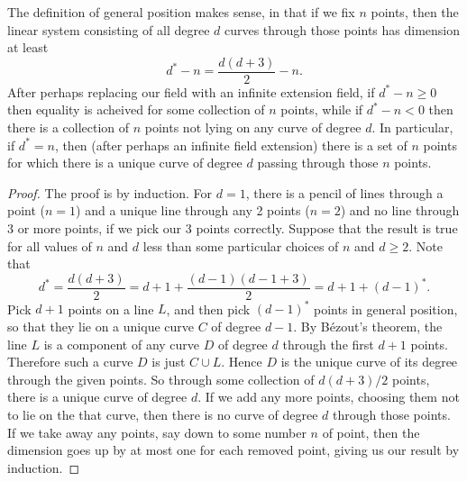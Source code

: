 \begin{lemma}\label{lemma:general.position.defined}
The definition of general position makes sense, in that if we fix \(n\) points, then the linear system consisting of all degree \(d\) curves through those points has dimension at least 
\[
d^*-n=\frac{d(d+3)}{2}-n.
\]
After perhaps replacing our field with an infinite extension field, if \(d^*-n \ge 0 \) then equality is acheived for some collection of \(n\) points, while if \(d^*-n<0\) then there is a collection of \(n\) points not lying on any curve of degree \(d\).
In particular, if \(d^*=n\), then (after perhaps an infinite field extension) there is a set of \(n\) points for which there is a unique curve of degree \(d\) passing through those \(n\) points.
\end{lemma}
\begin{proof}
The proof is by induction.
For \(d=1\), there is a pencil of lines through a point (\(n=1\)) and a unique line through any 2 points (\(n=2\)) and no line through 3 or more points, if we pick our 3 points correctly.
Suppose that the result is true for all values of \(n\) and \(d\) less than some particular choices of \(n\) and \(d \ge 2\).
Note that 
\[
d^*=\frac{d(d+3)}{2} = d+1+\frac{(d-1)(d-1+3)}{2} = d+1+(d-1)^*.
\]
Pick \(d+1\) points on a line \(L\), and then pick \((d-1)^*\) points in general position, so that they lie on a unique curve \(C\) of degree \(d-1\).
By B\'ezout's theorem, the line \(L\) is a component of any curve \(D\) of degree \(d\) through the first \(d+1\) points.
Therefore such a curve \(D\) is just \(C \cup L\).
Hence \(D\) is the unique curve of its degree through the given points.
So through some collection of \(d(d+3)/2\) points, there is a unique curve of degree \(d\).
If we add any more points, choosing them not to lie on the that curve, then there is no curve of degree \(d\) through those points.
If we take away any points, say down to some number \(n\) of point, then the dimension goes up by at most one for each removed point, giving us our result by induction.
\end{proof}
 
